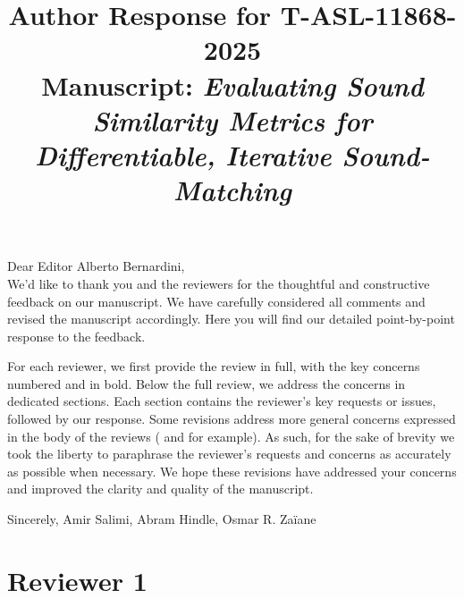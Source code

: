 \documentclass[11pt]{article}
\title{\vspace{-0.5em}Author Response for T-ASL-11868-2025\\
\large Manuscript: \emph{Evaluating Sound Similarity Metrics for Differentiable, Iterative Sound-Matching}}
\author{}
\date{}
\begin{document}
\maketitle
\vspace{-1.25em}

\noindent Dear Editor Alberto Bernardini, \\
\noindent
We'd like to thank you and the reviewers for the thoughtful and constructive feedback on our manuscript. We have carefully considered all comments and revised the manuscript accordingly. Here you will find our detailed point-by-point response to the feedback. 

For each reviewer, we first provide the review in full, with the key concerns numbered and in bold. Below the full review, we address the concerns in dedicated sections. Each section contains the reviewer's key requests or issues, followed by our response. Some revisions address more general concerns expressed in the body of the reviews ( and  for example). As such, for the sake of brevity we took the liberty to paraphrase the reviewer's requests and concerns as accurately as possible when necessary. We hope these revisions have addressed your concerns and improved the clarity and quality of the manuscript.

\medskip
\noindent Sincerely, Amir Salimi, Abram Hindle, Osmar R. Za{\"i}ane

\section{Reviewer 1}
\end{document}
